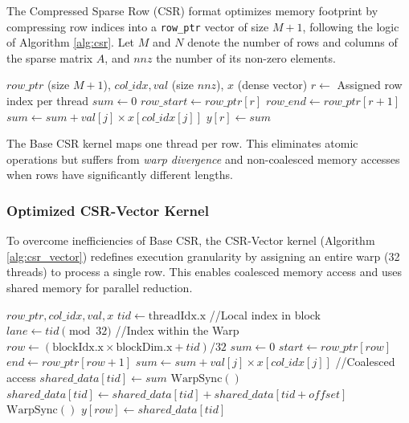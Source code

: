 \documentclass[conference]{IEEEtran}
\begin{document}
The Compressed Sparse Row (CSR) format optimizes memory footprint by compressing row indices into a \texttt{row\_ptr} vector of size $M+1$, following the logic of Algorithm \ref{alg:csr}.
Let $M$ and $N$ denote the number of rows and columns of the sparse matrix $A$, and $nnz$ the number of its non-zero elements.

\begin{algorithm}[h]
    \footnotesize
\caption{SpMV Kernel: CSR Scalar}\label{alg:csr}
\begin{algorithmic}[1]
\REQUIRE $row\_ptr$ (size $M+1$), $col\_idx, val$ (size $nnz$), $x$ (dense vector)
\STATE $r \gets$ Assigned row index per thread
\STATE $sum \gets 0$
\STATE $row\_start \gets row\_ptr[r]$
\STATE $row\_end \gets row\_ptr[r+1]$
\STATE $sum \gets sum + val[j] \times x[col\_idx[j]]$
\ENDFOR
\STATE $y[r] \gets sum$
\ENDIF
\end{algorithmic}
\end{algorithm}


The Base CSR kernel maps one thread per row. This eliminates atomic operations but suffers from \textit{warp divergence} and non-coalesced memory accesses when rows have significantly different lengths.


\subsubsection{Optimized CSR-Vector Kernel}

To overcome inefficiencies of Base CSR, the CSR-Vector kernel (Algorithm \ref{alg:csr_vector}) redefines execution granularity by assigning an entire warp (32 threads) to process a single row. This enables coalesced memory access and uses shared memory for parallel reduction. 
\begin{algorithm}[h]
    \footnotesize
\caption{SpMV Kernel: CSR-Vector (Warp-level Parallelism)}\label{alg:csr_vector}
\begin{algorithmic}[1]
\REQUIRE $row\_ptr, col\_idx, val, x$
\STATE $tid \gets \text{threadIdx.x}$ //Local index in block
\STATE $lane \gets tid \pmod{32}$ //Index within the Warp
\STATE $row \gets (\text{blockIdx.x} \times \text{blockDim.x} + tid) / 32$
    \STATE $sum \gets 0$
    \STATE $start \gets row\_ptr[row]$
    \STATE $end \gets row\_ptr[row+1]$
        \STATE $sum \gets sum + val[j] \times x[col\_idx[j]]$ //Coalesced access
    \ENDFOR
    \STATE $shared\_data[tid] \gets sum$
    \STATE $\text{WarpSync}()$
            \STATE $shared\_data[tid] \gets shared\_data[tid] + shared\_data[tid + offset]$
        \ENDIF
        \STATE $\text{WarpSync}()$
    \ENDFOR
        \STATE $y[row] \gets shared\_data[tid]$
    \ENDIF
\ENDIF
\end{algorithmic}
\end{algorithm}
\end{document}
